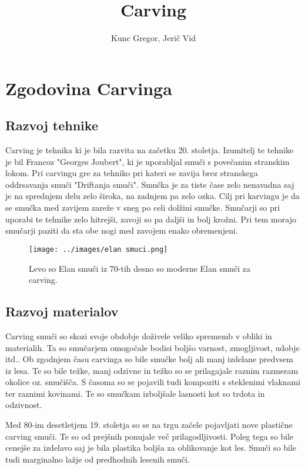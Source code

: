 \documentclass{article}
\title{Carving}
\author{Kunc Gregor, Jerič Vid}
\begin{document}
\maketitle

\section{Zgodovina Carvinga}

\subsection*{Razvoj tehnike}
Carving je tehnika ki je bila razvita na začetku 20. stoletja. Izumitelj te tehnike je bil Francoz "Georges Joubert", ki je uporabljal smuči s povečanim stranskim lokom.
Pri carvingu gre za tehniko pri kateri se zavija brez stranskega oddrsavanja smuči "Driftanja smuči".
Smučka je za tiste čase zelo nenavadna saj je na sprednjem delu zelo široka, na zadnjem pa zelo ozka.
Cilj pri karvingu je da se smučka med zavijem zareže v sneg po celi dolžini smučke. Smučarji so pri uporabi te tehnike zelo hitrejši, zavoji so pa daljši in bolj krožni. 
Pri tem morajo smučarji paziti da sta obe nogi med zavojem enako obremenjeni. 

\begin{figure}
    \centering
    \texttt{[image: ../images/elan smuci.png]} \\
    \caption[short]{Levo so Elan smuči iz 70-tih desno so moderne Elan smuči za carving.}
    \label{fig:slika1}
\end{figure}



\subsection*{Razvoj materialov}
Carving smuči so skozi svoje obdobje doživele veliko sprememb v obliki in materialih.
Ta so smučarjem omogočale bodisi boljšo varnost, zmogljivost, udobje itd..
Ob zgodnjem času carvinga so bile smučke bolj ali manj izdelane predvsem iz lesa.
Te so bile težke, manj odzivne in težko so se prilagajale raznim razmeram okolice oz. smučišča.
S časoma so se pojavili tudi kompoziti s steklenimi vlaknami ter raznimi kovinami.
Te so smučkam izboljšale lasnosti kot so trdota in odzivnost.


Med 80-im desetletjem 19. stoletja so se na trgu začele pojavljati nove plastične carving smuči.
Te so od prejšnih ponujale več prilagodljivosti. Poleg tega so bile cenejše za izdelavo saj je bila plastika boljša za oblikovanje kot les.
Smuči so bile tudi marginalno lažje od predhodnih lesenih smuči.
\end{document}

